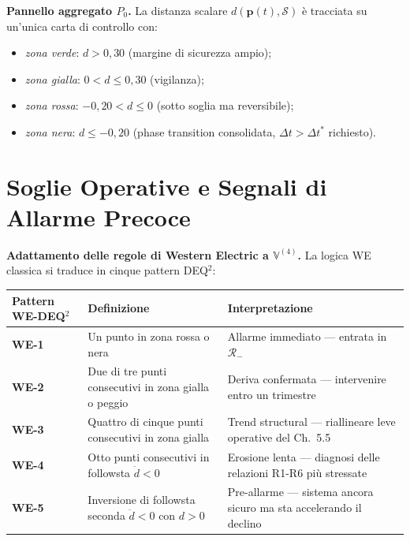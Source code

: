 \Hypoth{} \textbf{Pannello aggregato \(P_0\).} La distanza scalare
\(d(\boldsymbol{p}(t), \mathcal{S})\) è tracciata su un'unica carta di
controllo con:

\begin{itemize}
\tightlist
\item
  \emph{zona verde}: \(d > 0{,}30\) (margine di sicurezza ampio);
\item
  \emph{zona gialla}: \(0 < d \leq 0{,}30\) (vigilanza);
\item
  \emph{zona rossa}: \(-0{,}20 < d \leq 0\) (sotto soglia ma
  reversibile);
\item
  \emph{zona nera}: \(d \leq -0{,}20\) (phase transition consolidata,
  \(\Delta t > \Delta t^*\) richiesto).
\end{itemize}



\section{Soglie Operative e Segnali di Allarme
Precoce}\label{soglie-operative-e-segnali-di-allarme-precoce}

\Hypoth{} \textbf{Adattamento delle regole di Western Electric a
\(\mathbb{V}^{(4)}\).} La logica WE classica si traduce in cinque
pattern DEQ$^2$:

{\def\LTcaptype{none} %
{\small\begin{longtable}[]{@{}
  >{\raggedright\arraybackslash}p{}
  >{\raggedright\arraybackslash}p{}
  >{\raggedright\arraybackslash}p{}@{}}
\toprule\noalign{}
\begin{minipage}[b]{\linewidth}\raggedright
Pattern WE-DEQ$^2$
\end{minipage} & \begin{minipage}[b]{\linewidth}\raggedright
Definizione
\end{minipage} & \begin{minipage}[b]{\linewidth}\raggedright
Interpretazione
\end{minipage} \\
\midrule\noalign{}
\endhead
\bottomrule\noalign{}
\endlastfoot
\textbf{WE-1} & Un punto in zona rossa o nera & Allarme immediato ---
entrata in \(\mathcal{R}_-\) \\
\textbf{WE-2} & Due di tre punti consecutivi in zona gialla o peggio &
Deriva confermata --- intervenire entro un trimestre \\
\textbf{WE-3} & Quattro di cinque punti consecutivi in zona gialla &
Trend structural --- riallineare leve operative del Ch.~5.5 \\
\textbf{WE-4} & Otto punti consecutivi in followsta \(\dot d < 0\) &
Erosione lenta --- diagnosi delle relazioni R1-R6 più stressate \\
\textbf{WE-5} & Inversione di followsta seconda \(\ddot d < 0\) con
\(d > 0\) & Pre-allarme --- sistema ancora sicuro ma sta accelerando il
declino \\
\end{longtable}}
}


